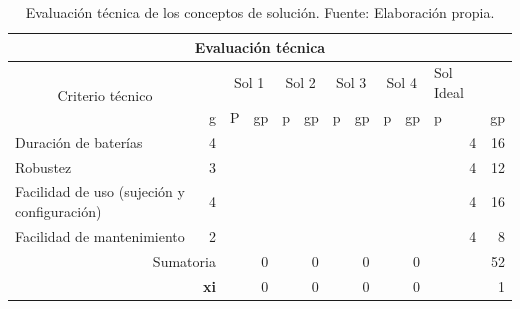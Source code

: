 \begin{table}[htbp]
	\centering
	\caption[Evaluación técnica de los conceptos de solución.]{Evaluación técnica de los conceptos de solución. Fuente: Elaboración propia. }
	\begin{tabular}{|r|r|r|r|r|r|r|r|r|r|r|r|}
		\hline
		\multicolumn{12}{|c|}{Evaluación técnica} \bigstrut\\
		\hline
		\multicolumn{1}{|c|}{\multirow{2}[4]{*}{Criterio técnico}} &       & \multicolumn{2}{c|}{Sol 1} & \multicolumn{2}{c|}{Sol 2} & \multicolumn{2}{c|}{Sol 3} & \multicolumn{2}{c|}{Sol 4} & \multicolumn{1}{l|}{Sol Ideal} &  \bigstrut\\
		\cline{2-12}          & \multicolumn{1}{l|}{g} & \multicolumn{1}{l|}{P} & \multicolumn{1}{l|}{gp} & \multicolumn{1}{l|}{p} & \multicolumn{1}{l|}{gp} & \multicolumn{1}{l|}{p} & \multicolumn{1}{l|}{gp} & \multicolumn{1}{l|}{p} & \multicolumn{1}{l|}{gp} & \multicolumn{1}{l|}{p} & \multicolumn{1}{l|}{gp} \bigstrut\\
		\hline
		\multicolumn{1}{|l|}{Duración de baterías} & 4     &       &       &       &       &       &       &       &       & 4     & 16 \bigstrut\\
		\hline
		\multicolumn{1}{|l|}{Robustez} & 3     &       &       &       &       &       &       &       &       & 4     & 12 \bigstrut\\
		\hline
		\multicolumn{1}{|l|}{Facilidad de uso (sujeción y configuración)} & 4     &       &       &       &       &       &       &       &       & 4     & 16 \bigstrut\\
		\hline
		\multicolumn{1}{|l|}{Facilidad de mantenimiento} & 2     &       &       &       &       &       &       &       &       & 4     & 8 \bigstrut[t]\\
		\multicolumn{2}{|r|}{Sumatoria} &       & 0     &       & 0     &       & 0     &       & 0     &       & 52 \bigstrut[b]\\
		\cline{1-2}\cline{4-4}\cline{6-6}\cline{8-8}\cline{10-10}\cline{12-12}    \multicolumn{2}{|r|}{\textbf{xi}} &       & \cellcolor[rgb]{ .816,  .808,  .808}0 &       & \cellcolor[rgb]{ .816,  .808,  .808}0 &       & \cellcolor[rgb]{ .816,  .808,  .808}0 &       & \cellcolor[rgb]{ .816,  .808,  .808}0 &       & \cellcolor[rgb]{ .816,  .808,  .808}1 \bigstrut\\
		\cline{1-2}\cline{4-4}\cline{6-6}\cline{8-8}\cline{10-10}\cline{12-12}    \end{tabular}%
	\label{tab:eval_tecnica}%
\end{table}%

